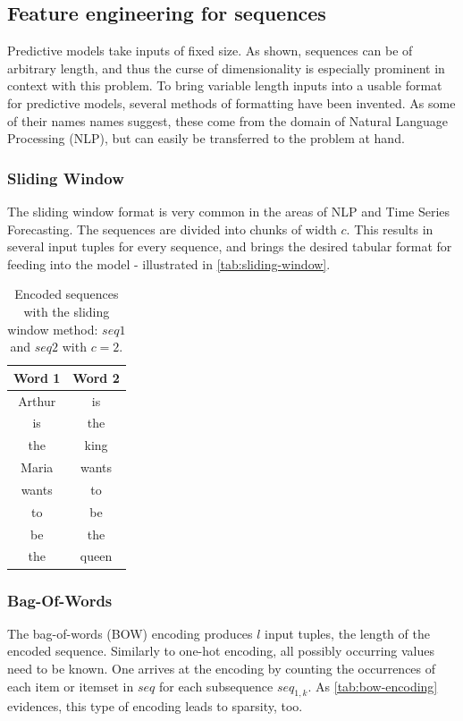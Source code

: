 \subsection{Feature engineering for sequences}
\label{sec:sequential-feature-engineering}
Predictive models take inputs of fixed size. As shown, sequences can be of arbitrary length, and thus the curse of dimensionality is especially prominent in context with this problem. To bring variable length inputs into a usable format for predictive models, several methods of formatting have been invented. As some of their names names suggest, these come from the domain of Natural Language Processing (NLP), but can easily be transferred to the problem at hand.

\subsubsection*{Sliding Window}
The sliding window format is very common in the areas of NLP and Time Series Forecasting. The sequences are divided into chunks of width $c$. This results in several input tuples for every sequence, and brings the desired tabular format for feeding into the model - illustrated in \autoref{tab:sliding-window}.

\begin{table}[ht]
    \centering
    \begin{tabular}{cc}
        Word 1 & Word 2\\
        \hline
        Arthur & is\\
        is & the\\
        the & king\\
        Maria & wants\\
        wants & to\\
        to & be\\
        be & the\\
        the & queen
    \end{tabular}
    \caption{Encoded sequences with the sliding window method: $seq1$ and $seq2$ with $c=2$.}
    \label{tab:sliding-window}
\end{table}

\subsubsection*{Bag-Of-Words}
The bag-of-words (BOW) encoding produces $l$ input tuples, the length of the encoded sequence. Similarly to one-hot encoding, all possibly occurring values need to be known. One arrives at the encoding by counting the occurrences of each item or itemset in $seq$ for each subsequence $seq_{1,k}$. As \autoref{tab:bow-encoding} evidences, this type of encoding leads to sparsity, too.

